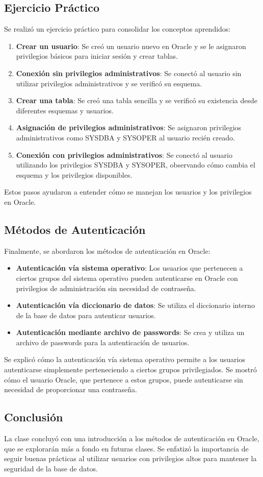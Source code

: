 \documentclass[12pt]{article}
\begin{document}
\subsection*{Ejercicio Práctico}
Se realizó un ejercicio práctico para consolidar los conceptos aprendidos:
\begin{enumerate}
    \item \textbf{Crear un usuario}: Se creó un usuario nuevo en Oracle y se le asignaron privilegios básicos para iniciar sesión y crear tablas.
    \item \textbf{Conexión sin privilegios administrativos}: Se conectó al usuario sin utilizar privilegios administrativos y se verificó su esquema.
    \item \textbf{Crear una tabla}: Se creó una tabla sencilla y se verificó su existencia desde diferentes esquemas y usuarios.
    \item \textbf{Asignación de privilegios administrativos}: Se asignaron privilegios administrativos como SYSDBA y SYSOPER al usuario recién creado.
    \item \textbf{Conexión con privilegios administrativos}: Se conectó al usuario utilizando los privilegios SYSDBA y SYSOPER, observando cómo cambia el esquema y los privilegios disponibles.
\end{enumerate}
Estos pasos ayudaron a entender cómo se manejan los usuarios y los privilegios en Oracle.

\subsection*{Métodos de Autenticación}
Finalmente, se abordaron los métodos de autenticación en Oracle:
\begin{itemize}
    \item \textbf{Autenticación vía sistema operativo}: Los usuarios que pertenecen a ciertos grupos del sistema operativo pueden autenticarse en Oracle con privilegios de administración sin necesidad de contraseña.
    \item \textbf{Autenticación vía diccionario de datos}: Se utiliza el diccionario interno de la base de datos para autenticar usuarios.
    \item \textbf{Autenticación mediante archivo de passwords}: Se crea y utiliza un archivo de passwords para la autenticación de usuarios.
\end{itemize}
Se explicó cómo la autenticación vía sistema operativo permite a los usuarios autenticarse simplemente perteneciendo a ciertos grupos privilegiados. Se mostró cómo el usuario Oracle, que pertenece a estos grupos, puede autenticarse sin necesidad de proporcionar una contraseña.

\subsection*{Conclusión}
La clase concluyó con una introducción a los métodos de autenticación en Oracle, que se explorarán más a fondo en futuras clases. Se enfatizó la importancia de seguir buenas prácticas al utilizar usuarios con privilegios altos para mantener la seguridad de la base de datos.
\end{document}
